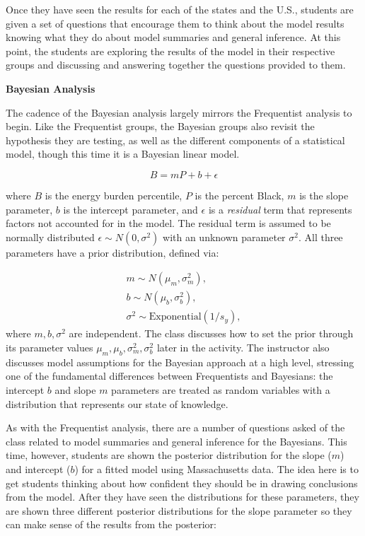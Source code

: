 \documentclass[
  12pt,
  letterpaper,
  DIV=11,
  numbers=noendperiod]{scrartcl}
\begin{document}
Once they have seen the results for each of the states and the U.S.,
students are given a set of questions that encourage them to think about
the model results knowing what they do about model summaries and general
inference. At this point, the students are exploring the results of the
model in their respective groups and discussing and answering together
the questions provided to them.

\textbf{Bayesian Analysis}

The cadence of the Bayesian analysis largely mirrors the Frequentist
analysis to begin. Like the Frequentist groups, the Bayesian groups also
revisit the hypothesis they are testing, as well as the different
components of a statistical model, though this time it is a Bayesian
linear model.

\[ B = m P + b + \epsilon \]

where \(B\) is the energy burden percentile, \(P\) is the percent Black,
\(m\) is the slope parameter, \(b\) is the intercept parameter, and
\(\epsilon\) is a \emph{residual} term that represents factors not
accounted for in the model. The residual term is assumed to be normally
distributed \(\epsilon \sim N(0, \sigma^2)\) with an unknown parameter
\(\sigma^2\). All three parameters have a prior distribution, defined
via:

\[
\begin{aligned} m \sim N(\mu_m, \sigma_m^2), \\ b \sim N(\mu_b, \sigma_b^2), \\ \sigma^2 \sim \text{Exponential}(1/s_y), \end{aligned}
\] where \(m, b, \sigma^2\) are independent. The class discusses how to
set the prior through its parameter values
\(\mu_m, \mu_b, \sigma_m^2, \sigma_b^2\) later in the activity. The
instructor also discusses model assumptions for the Bayesian approach at
a high level, stressing one of the fundamental differences between
Frequentists and Bayesians: the intercept \(b\) and slope \(m\)
parameters are treated as random variables with a distribution that
represents our state of knowledge.

As with the Frequentist analysis, there are a number of questions asked
of the class related to model summaries and general inference for the
Bayesians. This time, however, students are shown the posterior
distribution for the slope (\(m\)) and intercept (\(b\)) for a fitted
model using Massachusetts data. The idea here is to get students
thinking about how confident they should be in drawing conclusions from
the model. After they have seen the distributions for these parameters,
they are shown three different posterior distributions for the slope
parameter so they can make sense of the results from the posterior:
\end{document}

